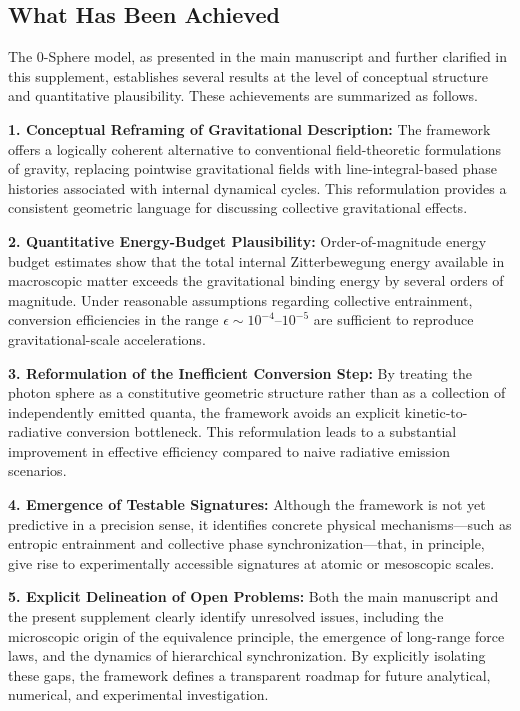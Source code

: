 \documentclass[12pt,letterpaper]{article}
\begin{document}

\subsection{What Has Been Achieved}
\label{subsec:achieved}

The 0-Sphere model, as presented in the main manuscript and further clarified in this supplement, establishes several results at the level of conceptual structure and quantitative plausibility. These achievements are summarized as follows.

\textbf{1. Conceptual Reframing of Gravitational Description:} The framework offers a logically coherent alternative to conventional field-theoretic formulations of gravity, replacing pointwise gravitational fields with line-integral-based phase histories associated with internal dynamical cycles. This reformulation provides a consistent geometric language for discussing collective gravitational effects.

\textbf{2. Quantitative Energy-Budget Plausibility:} Order-of-magnitude energy budget estimates show that the total internal Zitterbewegung energy available in macroscopic matter exceeds the gravitational binding energy by several orders of magnitude. Under reasonable assumptions regarding collective entrainment, conversion efficiencies in the range $\epsilon \sim 10^{-4}$--$10^{-5}$ are sufficient to reproduce gravitational-scale accelerations.

\textbf{3. Reformulation of the Inefficient Conversion Step:} By treating the photon sphere as a constitutive geometric structure rather than as a collection of independently emitted quanta, the framework avoids an explicit kinetic-to-radiative conversion bottleneck. This reformulation leads to a substantial improvement in effective efficiency compared to naive radiative emission scenarios.

\textbf{4. Emergence of Testable Signatures:} Although the framework is not yet predictive in a precision sense, it identifies concrete physical mechanisms—such as entropic entrainment and collective phase synchronization—that, in principle, give rise to experimentally accessible signatures at atomic or mesoscopic scales.

\textbf{5. Explicit Delineation of Open Problems:} Both the main manuscript and the present supplement clearly identify unresolved issues, including the microscopic origin of the equivalence principle, the emergence of long-range force laws, and the dynamics of hierarchical synchronization. By explicitly isolating these gaps, the framework defines a transparent roadmap for future analytical, numerical, and experimental investigation.
\end{document}
